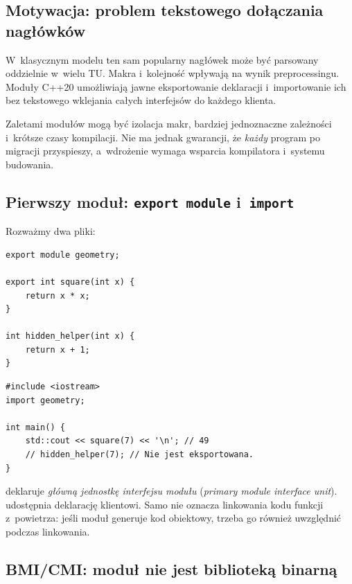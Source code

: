 \subsection{Motywacja: problem tekstowego dołączania nagłówków}

W~klasycznym modelu ten sam popularny nagłówek może być parsowany
oddzielnie w~wielu TU. Makra i~kolejność  wpływają
na wynik preprocessingu. Moduły C++20 umożliwiają jawne eksportowanie
deklaracji i~importowanie ich bez tekstowego wklejania całych
interfejsów do każdego klienta.

Zaletami modułów mogą być izolacja makr, bardziej jednoznaczne
zależności i~krótsze czasy kompilacji. Nie ma jednak gwarancji,
że \emph{każdy} program po migracji przyspieszy, a~wdrożenie
wymaga wsparcia kompilatora i~systemu budowania.

\subsection{Pierwszy moduł: \texttt{export module} i~\texttt{import}}

Rozważmy dwa pliki:
\begin{lstlisting}[caption={Interfejs modułu geometry: plik geometry.cppm.}]
export module geometry;

export int square(int x) {
    return x * x;
}

int hidden_helper(int x) {
    return x + 1;
}
\end{lstlisting}

\begin{lstlisting}[caption={Klient modułu: plik main.cpp.}]
#include <iostream>
import geometry;

int main() {
    std::cout << square(7) << '\n'; // 49
    // hidden_helper(7); // Nie jest eksportowana.
}
\end{lstlisting}

 deklaruje \emph{główną jednostkę
interfejsu modułu} (\emph{primary module interface unit}).
 udostępnia deklarację klientowi.
Samo  nie oznacza linkowania kodu funkcji
z~powietrza: jeśli moduł generuje kod obiektowy, trzeba go również
uwzględnić podczas linkowania.

\subsection{BMI/CMI: moduł nie jest biblioteką binarną}

